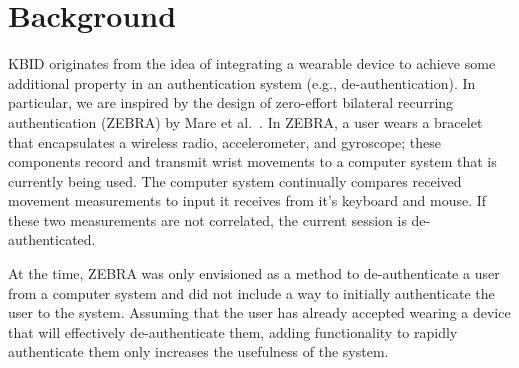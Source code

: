 \documentclass[runningheads,a4paper]{llncs}
\begin{document}

\section{Background}\label{sec:background}
KBID originates from the idea of integrating a wearable device to achieve some additional property in an authentication system (e.g., de-authentication). In particular, we are inspired by the design of zero-effort bilateral recurring authentication (ZEBRA) by Mare et al.~\cite{mare:zebra:2014}. In ZEBRA, a user wears a bracelet that encapsulates a wireless radio, accelerometer, and gyroscope; these components record and transmit wrist movements to a computer system that is currently being used. The computer system continually compares received movement measurements to input it receives from it's keyboard and mouse. If these two measurements are not correlated, the current session is de-authenticated. 

At the time, ZEBRA was only envisioned as a method to de-authenticate a user from a computer system and did not include a way to initially authenticate the user to the system.  Assuming that the user has already accepted wearing a device that will effectively de-authenticate them, adding functionality to rapidly authenticate them only increases the usefulness of the system.
\end{document}
